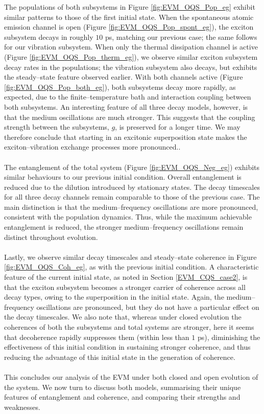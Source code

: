 \documentclass[11pt]{article}
\begin{document}
The populations of both subsystems in Figure \ref{fig:EVM_OQS_Pop_eg} exhibit similar patterns to those of the first initial state. When the spontaneous atomic emission channel is open (Figure \ref{fig:EVM_OQS_Pop_spont_eg}), the exciton subsystem decays in roughly $10$ ps, matching our previous case; the same follows for our vibration subsystem. When only the thermal dissipation channel is active (Figure \ref{fig:EVM_OQS_Pop_therm_eg}), we observe similar exciton subsystem decay rates in the populations; the vibration subsystem also decays, but exhibits the steady--state feature observed earlier. With both channels active (Figure \ref{fig:EVM_OQS_Pop_both_eg}), both subsystems decay more rapidly, as expected, due to the finite--temperature bath and interaction coupling between both subsystems. An interesting feature of all three decay models, however, is that the medium oscillations are much stronger. This suggests that the coupling strength between the subsystems, $g$, is preserved for a longer time. We may therefore conclude that starting in an excitonic superposition state makes the exciton--vibration exchange processes more pronounced..\\
\\
The entanglement of the total system (Figure \ref{fig:EVM_OQS_Neg_eg}) exhibits similar behaviours to our previous initial condition. Overall entanglement is reduced due to the dilution introduced by stationary states. The decay timescales for all three decay channels remain comparable to those of the previous case. The main distinction is that the medium--frequency oscillations are more pronounced, consistent with the population dynamics. Thus, while the maximum achievable entanglement is reduced, the stronger medium--frequency oscillations remain distinct throughout evolution. \\
\\
Lastly, we observe similar decay timescales and steady--state coherence in Figure \ref{fig:EVM_OQS_Coh_eg}, as with the previous initial condition. A characteristic feature of the current initial state, as noted in Section \ref{EVM_CQS_case2}, is that the exciton subsystem becomes a stronger carrier of coherence across all decay types, owing to the  superposition in the initial state. Again, the medium--frequency oscillations are pronounced, but they do not have a particular effect on the decay timescales. We also note that, whereas under closed evolution the coherences of both the subsystems and total systems are stronger, here it seems that decoherence rapidly suppresses them (within less than $1$ ps), diminishing the effectiveness of this initial condition in sustaining stronger coherence, and thus reducing the advantage of this initial state in the generation of coherence.\\
\\
This concludes our analysis of the EVM under both closed and open evolution of the system. We now turn to discuss both models, summarising their unique features of entanglement and coherence, and comparing their strengths and weaknesses. 
\end{document}
